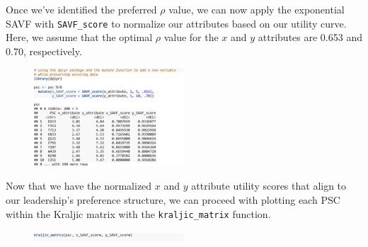 \documentclass[twocolumn]{svjour3}       %
\begin{document}
Once we've identified the preferred $\rho$ value, we can now apply the exponential SAVF with \texttt{SAVF\_score} to normalize our attributes based on our utility curve. Here, we assume that the optimal $\rho$ value for the $x$ and $y$ attributes are 0.653 and 0.70, respectively.
% 
% 
\begin{figure}[!htb]
  \includegraphics[width=0.5\textwidth]{code8.png}
\end{figure}

Now that we have the normalized $x$ and $y$ attribute utility scores that align to our leadership's preference structure, we can proceed with plotting each PSC within the Kraljic matrix with the \texttt{kraljic\_matrix} function.
\begin{figure}[!htb]
  \includegraphics[width=0.5\textwidth]{code9.png}
\end{figure}
\end{document}
